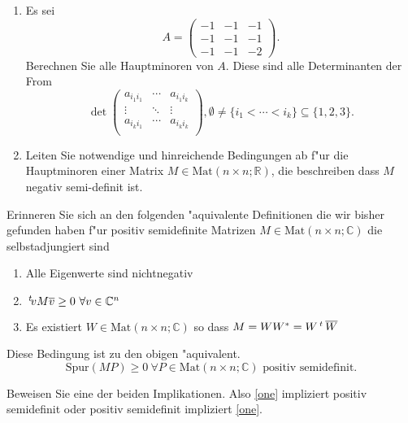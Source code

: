 \documentclass[a4,11pt]{article}
\begin{document}
\newpage

\begin{aufgabe}
\begin{enumerate}
\item
Es sei
\[
A =
\begin{pmatrix}
-1 & -1 & -1\\
-1 & -1 & -1 \\
-1 & -1 & -2
\end{pmatrix}.
\]
Berechnen Sie alle Hauptminoren von $A$. Diese sind alle Determinanten der From
\[
\det \begin{pmatrix} a_{i_1 i_1} & \cdots & a_{i_1 i_k} \\ \vdots & \ddots & \vdots \\ a_{i_k i_1} & \cdots & a_{i_k i_k} \\ \end{pmatrix}, \emptyset \neq \{ i_1  < \cdots < i_k \} \subseteq \{ 1, 2, 3\} .
\]
\item
Leiten Sie notwendige und hinreichende Bedingungen ab f"ur die Hauptminoren einer Matrix $M \in \text{Mat}(n \times n ; \mathbb{R})$, die beschreiben dass $M$ negativ semi-definit ist.
\end{enumerate}
\end{aufgabe}

\newpage

\begin{aufgabe}
Erinneren Sie sich an den folgenden "aquivalente Definitionen die wir bisher gefunden haben f"ur positiv semidefinite Matrizen $M \in \text{Mat}(n\times n ; \mathbb{C})$ die selbstadjungiert sind
\begin{enumerate}
\item Alle Eigenwerte sind nichtnegativ
\item  $\transpose v M \overline{v} \geq 0 \ \forall v \in \mathbb{C}^n$
\item Es existiert $W \in \text{Mat}(n\times n ; \mathbb{C})$ so dass $M = W W^* = W \,^t\!\  \overline{W}$
\end{enumerate}
Diese Bedingung ist zu den obigen "aquivalent.
\begin{equation}
\label{one}
\text{Spur}(MP) \geq 0 \ \forall P \in  \text{Mat}(n\times n ; \mathbb{C}) \text{ positiv semidefinit}.
\end{equation}

Beweisen Sie eine der beiden Implikationen. Also \ref{one} impliziert positiv semidefinit oder positiv semidefinit impliziert \ref{one}.


\end{aufgabe}
\end{document}
